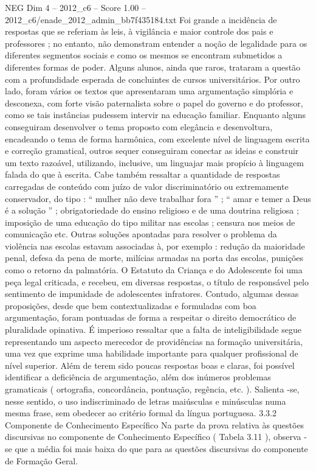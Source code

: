 \begin{textsample}{NEG Dim 4 – 2012\_c6 – Score 1.00 – 2012\_c6/enade\_2012\_admin\_bb7f435184.txt}
Foi grande a incidência de respostas que se referiam às leis, à vigilância e maior controle dos pais e professores ; no entanto, não demonstram entender a noção de legalidade para os diferentes segmentos sociais e como os mesmos se encontram submetidos a diferentes formas de poder.
Alguns alunos, ainda que raros, trataram a questão com a profundidade esperada de concluintes de cursos universitários.
Por outro lado, foram vários os textos que apresentaram uma argumentação simplória e desconexa, com forte visão paternalista sobre o papel do governo e do professor, como se tais instâncias pudessem intervir na educação familiar.
Enquanto alguns conseguiram desenvolver o tema proposto com elegância e desenvoltura, encadeando o tema de forma harmônica, com excelente nível de linguagem escrita e correção gramatical, outros sequer conseguiram conectar as ideias e construir um texto razoável, utilizando, inclusive, um linguajar mais propício à linguagem falada do que à escrita.
Cabe também ressaltar a quantidade de respostas carregadas de conteúdo com juízo de valor discriminatório ou extremamente conservador, do tipo : “ mulher não deve trabalhar fora ” ; “ amar e temer a Deus é a solução ” ; obrigatoriedade do ensino religioso e de uma doutrina religiosa ; imposição de uma educação do tipo militar nas escolas ; censura nos meios de comunicação etc.
Outras soluções apontadas para resolver o problema da violência nas escolas estavam associadas à, por exemplo : redução da maioridade penal, defesa da pena de morte, milícias armadas na porta das escolas, punições como o retorno da palmatória.
O Estatuto da Criança e do Adolescente foi uma peça legal criticada, e recebeu, em diversas respostas, o título de responsável pelo sentimento de impunidade de adolescentes infratores.
Contudo, algumas dessas proposições, desde que bem contextualizadas e formuladas com boa argumentação, foram pontuadas de forma a respeitar o direito democrático de pluralidade opinativa.
É imperioso ressaltar que a falta de inteligibilidade segue representando um aspecto merecedor de providências na formação universitária, uma vez que exprime uma habilidade importante para qualquer profissional de nível superior.
Além de terem sido poucas respostas boas e claras, foi possível identificar a deficiência de argumentação, além dos inúmeros problemas gramaticais ( ortografia, concordância, pontuação, regência, etc. ).
Salienta -se, nesse sentido, o uso indiscriminado de letras maiúsculas e minúsculas numa mesma frase, sem obedecer ao critério formal da língua portuguesa. 3.3.2 Componente de Conhecimento Específico Na parte da prova relativa às questões discursivas no componente de Conhecimento Específico ( Tabela 3.11 ), observa -se que a média foi mais baixa do que para as questões discursivas do componente de Formação Geral.

\end{textsample}
